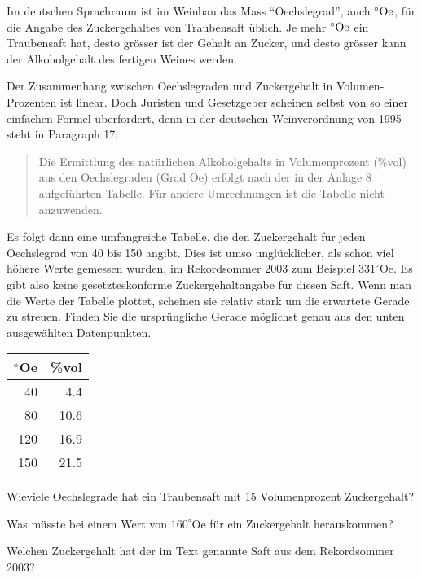 Im deutschen Sprachraum ist im Weinbau das Mass ``Oechslegrad'', auch
$\mathstrut^\circ\text{Oe}$,
für die
Angabe des Zuckergehaltes von Traubensaft üblich. Je mehr 
$\mathstrut^\circ\text{Oe}$
ein Traubensaft hat, desto grösser ist der Gehalt an Zucker, und desto
grösser kann der Alkoholgehalt des fertigen Weines werden.

Der Zusammenhang zwischen Oechslegraden und Zuckergehalt in Volumen-Prozenten
ist linear. Doch Juristen und Gesetzgeber scheinen selbst von so einer einfachen
Formel überfordert, denn in der deutschen Weinverordnung von 1995 steht
in Paragraph 17: 
\begin{quote}
Die Ermittlung des natürlichen Alkoholgehalts in Volumenprozent (\%vol)
aus den Oechslegraden (Grad Oe) erfolgt nach der in der Anlage 8
aufgeführten Tabelle. Für andere Umrechnungen ist die Tabelle nicht
anzuwenden.
\end{quote}
Es folgt dann eine umfangreiche
Tabelle, die den Zuckergehalt für jeden Oechslegrad von 40 bis
150 angibt. Dies ist umso unglücklicher, als schon viel höhere
Werte gemessen wurden, im Rekordsommer 2003 zum Beispiel $331^\circ\text{Oe}$.
Es gibt also keine gesetzteskonforme Zuckergehaltangabe für diesen Saft.
Wenn man die Werte der Tabelle plottet, scheinen
sie relativ stark um die erwartete Gerade zu streuen. Finden Sie die
ursprüngliche Gerade möglichst genau aus den unten ausgewählten
Datenpunkten.
\begin{center}
\begin{tabular}{|r|r|}
\hline
$\mathstrut^\circ$Oe&\%vol\\
\hline
 40& 4.4\\
 80&10.6\\
120&16.9\\
150&21.5\\
\hline
\end{tabular}
\end{center}
\begin{teilaufgaben}
\item
Wieviele Oechslegrade hat ein Traubensaft mit 15 Volumenprozent Zuckergehalt?
\item
Was müsste bei einem Wert von $160^\circ\text{Oe}$ für ein Zuckergehalt 
herauskommen?
\item 
Welchen Zuckergehalt hat der im Text genannte Saft aus dem Rekordsommer 2003?
\end{teilaufgaben}


